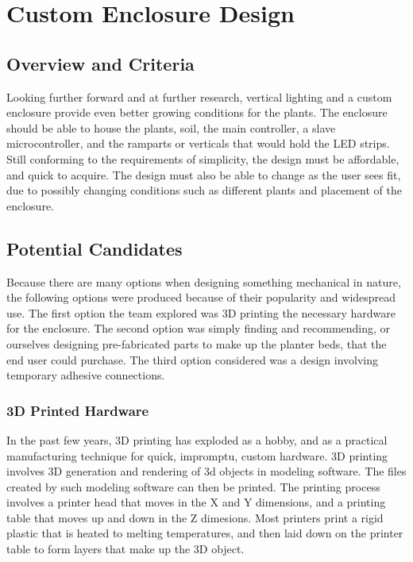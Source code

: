 \documentclass[onecolumn, draftclsnofoot,10pt, compsoc]{IEEEtran}
\begin{document}
	\section{Custom Enclosure Design}

		\subsection{Overview and Criteria}
		Looking further forward and at further research, vertical lighting and a custom enclosure provide even better growing conditions for the plants.  The enclosure should
		be able to house the plants, soil, the main controller, a slave microcontroller, and the ramparts or verticals that would hold the LED strips.  Still conforming to the
		requirements of simplicity, the design must be affordable, and quick to acquire.  The design must also be able to change as the user sees fit, due to possibly changing
		conditions such as different plants and placement of the enclosure.

		\subsection{Potential Candidates}
		Because there are many options when designing something mechanical in nature, the following options were produced because of their popularity and widespread use.  The
		first option the team explored was 3D printing the necessary hardware for the enclosure.  The second option was simply finding and recommending, or ourselves designing
		pre-fabricated parts to make up the planter beds, that the end user could purchase.  The third option considered was a design involving temporary adhesive connections.

		\subsubsection{3D Printed Hardware}
		In the past few years, 3D printing has exploded as a hobby, and as a practical manufacturing technique for quick, impromptu, custom hardware.  3D printing involves 3D
		generation and rendering of 3d objects in modeling software.  The files created by such modeling software can then be printed.  The printing process involves a printer
		head that moves in the X and Y dimensions, and a printing table that moves up and down in the Z dimesions.  Most printers print a rigid plastic that is heated to
		melting temperatures, and then laid down on the printer table to form layers that make up the 3D object.
\end{document}
